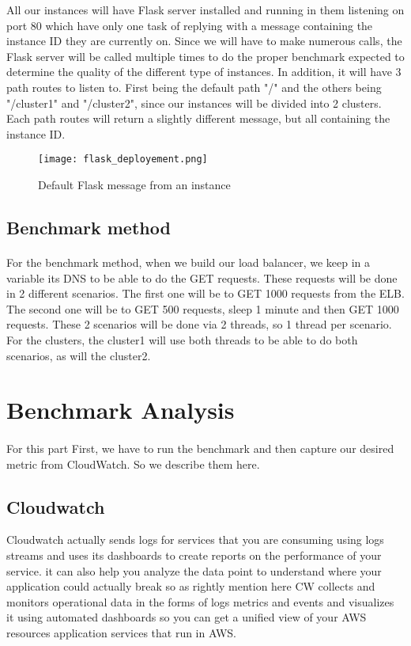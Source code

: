 \documentclass[12pt]{article}
\begin{document}
		All our instances will have Flask server installed and running in them listening on port 80 which have only one task of replying
		with a message containing the instance ID they are currently on. Since we will have to make numerous calls, the Flask server 
		will be called multiple times to do the proper benchmark expected to determine the quality of the different type of instances. In addition, it will have 3 path routes to listen to. First being the default path "/" and the others being "/cluster1" and "/cluster2", since our instances will be divided into 2 clusters. Each path routes will return a slightly different message, but all containing the instance ID.
		\begin{figure}[htpb]
        \centering
        \texttt{[image: flask\_deployement.png]}
            \caption{Default Flask message from an instance}
            \label{fig:cw}
        \end{figure}
		\bigskip

	\subsection{Benchmark method}
		\paragraph{} For the benchmark method, when we build our load balancer, we keep in a variable its DNS to be able to do the GET requests.
		These requests will be done in 2 different scenarios. The first one will be to GET 1000 requests from the ELB. The second one will be to 
		GET 500 requests, sleep 1 minute and then GET 1000 requests. These 2 scenarios will be done via 2 threads, so 1 thread per scenario. For 
		the clusters, the cluster1 will use both threads to be able to do both scenarios, as will the cluster2.
		\bigskip
		\pagebreak

\section{Benchmark Analysis} \label{sec:benchmark}
	\paragraph{} For  this part First, we have to run the benchmark and then capture our desired metric from CloudWatch. So we describe them here.
        \subsection{Cloudwatch}
        Cloudwatch actually sends logs for services that you are consuming using logs streams and uses its dashboards to create reports on the performance of your service. it can also help you analyze the data point to understand where your application could actually break so as rightly mention here CW collects and monitors operational data in the forms of logs metrics and events and visualizes it using automated dashboards  so you can get a unified view of your AWS resources application services that run in AWS.
\end{document}
